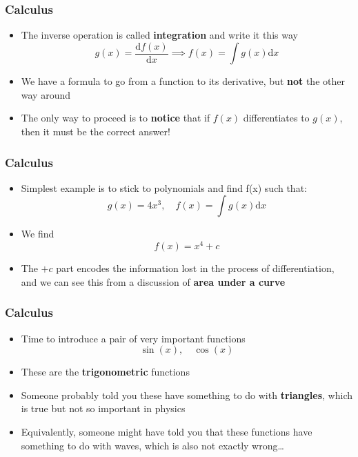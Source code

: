 \documentclass{beamer}
\begin{document}
\begin{frame}
  \frametitle{Calculus}
  \begin{itemize}
    \item<1-> The inverse operation is called \textbf{integration} and write it this way
      \begin{equation*}
	g(x)=\frac{\mathrm{d}f(x)}{\mathrm{d}x}\implies f(x)=\int g(x)\mathrm{d}x
	\label{<+label+>}
      \end{equation*}
    \item<2-> We have a formula to go from a function to its derivative, but \textbf{not} the other way around
    \item<3-> The only way to proceed is to \textbf{notice} that if $f(x)$ differentiates to $g(x)$, then it must be the correct answer!
  \end{itemize}
\end{frame}

\begin{frame}
  \frametitle{Calculus}
  \begin{itemize}
    \item<1-> Simplest example is to stick to polynomials and find f(x) such that:
      \begin{equation*}
	g(x)=4x^3, \quad f(x)=\int g(x)\mathrm{d}x
	\label{<+label+>}
      \end{equation*}
    \item<2-> We find
\begin{equation}
  f(x)=x^4+c
  \label{<+label+>}
\end{equation}
    \item<3-> The $+c$ part encodes the information lost in the process of differentiation, and we can see this from a discussion of \textbf{area under a curve}
  \end{itemize}
\end{frame}

\begin{frame}
  \frametitle{Calculus}
  \begin{itemize}
    \item<1-> Time to introduce a pair of very important functions
      \begin{equation*}
	\sin(x), \quad \cos(x)
      \end{equation*}
    \item<2-> These are the \textbf{trigonometric} functions
    \item<3-> Someone probably told you these have something to do with \textbf{triangles}, which is true but not so important in physics
    \item<4-> Equivalently, someone might have told you that these functions have something to do with waves, which is also not exactly wrong\ldots
  \end{itemize}
\end{frame}
\end{document}
